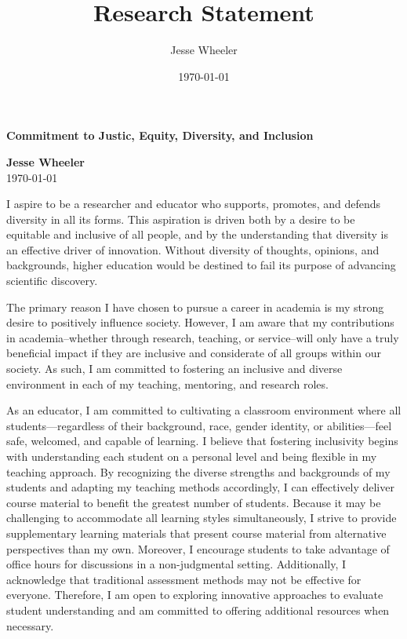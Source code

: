 \documentclass[11pt]{article}
\title{Research Statement}
\author{Jesse Wheeler}
\date{\today}
\begin{document}
\rule{0mm}{1mm}
\vspace{-20mm}


\vspace{1mm}

\begin{center}
{\Large {\bf Commitment to Justic, Equity, Diversity, and Inclusion}}

\vspace{2mm}

{\bf Jesse Wheeler} \\
\today
\end{center}


\vspace{4mm}


I aspire to be a researcher and educator who supports, promotes, and defends diversity in all its forms.
This aspiration is driven both by a desire to be equitable and inclusive of all people, and by the understanding that diversity is an effective driver of innovation.
Without diversity of thoughts, opinions, and backgrounds, higher education would be destined to fail its purpose of advancing scientific discovery.

The primary reason I have chosen to pursue a career in academia is my strong desire to positively influence society.
However, I am aware that my contributions in academia--whether through research, teaching, or service--will only have a truly beneficial impact if they are inclusive and considerate of all groups within our society.
As such, I am committed to fostering an inclusive and diverse environment in each of my teaching, mentoring, and research roles.

As an educator, I am committed to cultivating a classroom environment where all students---regardless of their background, race, gender identity, or abilities---feel safe, welcomed, and capable of learning.
I believe that fostering inclusivity begins with understanding each student on a personal level and being flexible in my teaching approach.
By recognizing the diverse strengths and backgrounds of my students and adapting my teaching methods accordingly, I can effectively deliver course material to benefit the greatest number of students.
Because it may be challenging to accommodate all learning styles simultaneously, I strive to provide supplementary learning materials that present course material from alternative perspectives than my own.
Moreover, I encourage students to take advantage of office hours for discussions in a non-judgmental setting.
Additionally, I acknowledge that traditional assessment methods may not be effective for everyone.
Therefore, I am open to exploring innovative approaches to evaluate student understanding and am committed to offering additional resources when necessary.
\end{document}
